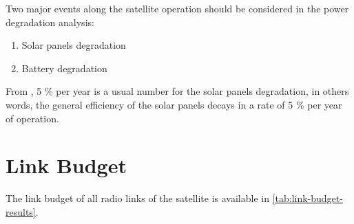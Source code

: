 Two major events along the satellite operation should be considered in the power degradation analysis:

\begin{enumerate}
    \item Solar panels degradation
    \item Battery degradation
\end{enumerate}

From \cite{larson2005}, 5 \% per year is a usual number for the solar panels degradation, in others words, the general efficiency of the solar panels decays in a rate of 5 \% per year of operation.%


\section{Link Budget}

The link budget of all radio links of the satellite is available in \autoref{tab:link-budget-results}.

